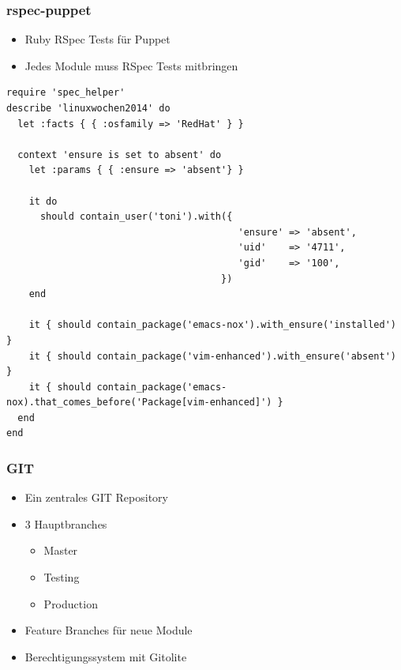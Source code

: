 \documentclass{beamer}
\begin{document}
\begin{frame}[fragile]
  \frametitle{rspec-puppet}

  \begin{itemize}
  \item Ruby RSpec Tests für Puppet
  \item Jedes Module muss RSpec Tests mitbringen
  \end{itemize}

  \begin{lstlisting}
require 'spec_helper'
describe 'linuxwochen2014' do
  let :facts { { :osfamily => 'RedHat' } }

  context 'ensure is set to absent' do
    let :params { { :ensure => 'absent'} }

    it do
      should contain_user('toni').with({
                                         'ensure' => 'absent',
                                         'uid'    => '4711',
                                         'gid'    => '100',
                                      })
    end

    it { should contain_package('emacs-nox').with_ensure('installed') }
    it { should contain_package('vim-enhanced').with_ensure('absent') }
    it { should contain_package('emacs-nox).that_comes_before('Package[vim-enhanced]') }
  end
end
  \end{lstlisting}

\end{frame}

\begin{frame}
\end{frame}

\begin{frame}
\end{frame}

\begin{frame}
  \frametitle{GIT}

  \begin{itemize}
  \item Ein zentrales GIT Repository
  \item 3 Hauptbranches
    \begin{itemize}
    \item Master
    \item Testing
    \item Production
    \end{itemize}
  \item Feature Branches für neue Module
  \item Berechtigungssystem mit Gitolite
  \end{itemize}
\end{frame}
\end{document}

